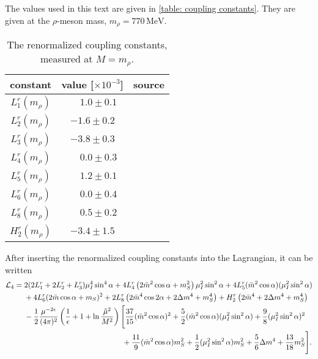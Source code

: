 The values used in this text are given in \autoref{table: coupling constants}.
They are given at the $\rho$-meson mass, $m_\rho = 770\, \text{MeV}$.
%
\begin{table}
    \centering
    \def\arraystretch{1.2}
    \caption{The renormalized coupling constants, measured at $M = m_\rho$.}
    \label{table: coupling constants}
    \begin{tabular}{c c c}
        \hline \hline
        constant & value [$\times 10^{-3}$] & source \\
        \hline
        $L_1^r(m_\rho)$ & $\phantom{-}1.0 \pm 0.1 $ & \autocite{bijnensMesonicLowEnergyConstants2014} \\
        $L_2^r(m_\rho)$ & $-1.6 \pm 0.2 $ & \autocite{bijnensMesonicLowEnergyConstants2014} \\
        $L_3^r(m_\rho)$ & $-3.8 \pm 0.3 $ & \autocite{bijnensMesonicLowEnergyConstants2014} \\
        $L_4^r(m_\rho)$ & $\phantom{-}0.0 \pm 0.3 $ & \autocite{bijnensMesonicLowEnergyConstants2014} \\
        $L_5^r(m_\rho)$ & $\phantom{-}1.2 \pm 0.1 $ & \autocite{bijnensMesonicLowEnergyConstants2014} \\
        $L_6^r(m_\rho)$ & $\phantom{-}0.0 \pm 0.4 $ & \autocite{bijnensMesonicLowEnergyConstants2014} \\
        $L_8^r(m_\rho)$ & $\phantom{-}0.5 \pm 0.2 $ & \autocite{bijnensMesonicLowEnergyConstants2014} \\
        $H_2^r(m_\rho)$ & $-3.4 \pm 1.5 $ & \autocite{jaminFlavoursymmetryBreakingQuark2002} 
    \end{tabular}
\end{table}
%
After inserting the renormalized coupling constants into the Lagrangian, it can be written
%
\begin{align}
    \label{nlo static lagrangian}
    \nonumber
    \mathcal{L}_4
    = {}&
    2(2L_1^r + 2L_2^r + L_3^r) \mu_I^4 \sin^4\alpha
    + 4  L_4^r \left( 2 \bar m^2 \cos\alpha + m_S^2 \right) \mu_I^2\sin^2\alpha
    + 4 L_5^r (\bar m^2 \cos\alpha) (\mu_I^2  \sin^2 \alpha )
    \\ \nonumber
    & 
    + 4 L_6^r (2\bar m\cos\alpha + m_S)^2
    + 2 L_8^r \left(2 \bar m^4 \cos2\alpha + 2 \Delta m^4 + m_S^4\right)
    + H_2^r \left(2\bar m^4 + 2\Delta m^4 + m_S^4 \right)
    \\ \nonumber
    &
    - \frac{1}{2}\frac{\mu^{-2\epsilon}}{(4\pi)^2}
    \left( \frac{1}{\epsilon} + 1 + \ln\frac{\tilde \mu^2}{M^2} \right)
    \Bigg[
        \frac{37}{15} (\bar m^2 \cos\alpha)^2
        +\frac{5}{2} (\bar m^2 \cos\alpha)(\mu_I^2\sin^2\alpha)
        +\frac{9}{8} (\mu_I^2\sin^2\alpha)^2 \\
        &
        \quad\quad\quad\quad\quad\quad\quad\quad\quad\quad\quad\quad\quad
        +\frac{11}{9} (\bar m^2 \cos\alpha)m_S^2
        +\frac{1}{2} (\mu_I^2\sin^2\alpha)m_S^2
        +\frac{5}{6} \Delta m^4
        +\frac{13}{18} m_S^2
    \Bigg].
\end{align}




